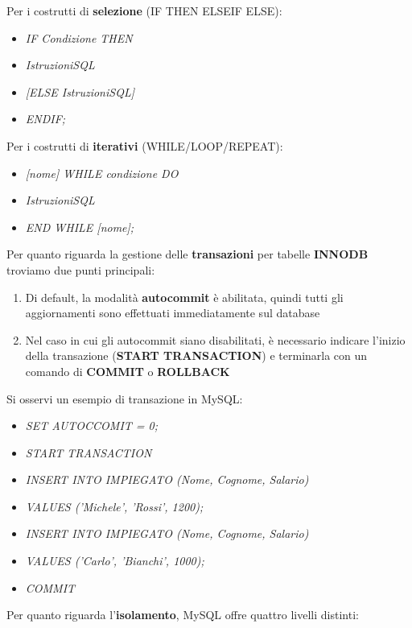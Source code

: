 \documentclass{article}
\begin{document}
Per i costrutti di \textbf{selezione} (IF THEN ELSEIF ELSE):
\begin{itemize}[label={ }, leftmargin=1cm]
    \item \textit{IF Condizione THEN}
    \item \quad \textit{IstruzioniSQL}
    \item \textit{[ELSE IstruzioniSQL]}
    \item \textit{ENDIF;}\\
\end{itemize}
Per i costrutti di \textbf{iterativi} (WHILE/LOOP/REPEAT):
\begin{itemize}[label={ }, leftmargin=1cm]
    \item \textit{[nome] WHILE condizione DO}
    \item \quad \textit{IstruzioniSQL}
    \item \textit{END WHILE [nome];}\vspace{14pt}\\
\end{itemize}
Per quanto riguarda la gestione delle \textbf{transazioni} per tabelle \textbf{INNODB} troviamo due punti principali:
\begin{enumerate}[label={-}, leftmargin=1cm]
    \item Di default, la modalità \textbf{autocommit} è abilitata, quindi tutti gli aggiornamenti sono effettuati immediatamente sul database
    \item Nel caso in cui gli autocommit siano disabilitati, è necessario indicare l’inizio della transazione (\textbf{START TRANSACTION}) e terminarla con un comando di \textbf{COMMIT} o \textbf{ROLLBACK}
\end{enumerate}
Si osservi un esempio di transazione in MySQL:
\begin{itemize}[label={ }, leftmargin=1cm]
    \item \textit{SET AUTOCCOMIT = 0;}
    \item \textit{START TRANSACTION}
    \item \textit{INSERT INTO IMPIEGATO (Nome, Cognome, Salario)}
    \item \textit{VALUES ('Michele', 'Rossi', 1200);}
    \item \textit{INSERT INTO IMPIEGATO (Nome, Cognome, Salario)}
    \item \textit{VALUES ('Carlo', 'Bianchi', 1000);}
    \item \textit{COMMIT}
\end{itemize}
Per quanto riguarda l'\textbf{isolamento}, MySQL offre quattro livelli distinti:
\end{document}
